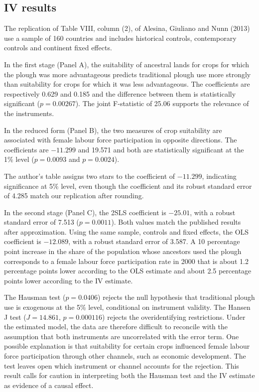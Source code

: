 \documentclass[12pt,a4paper]{article}
\begin{document}
\subsection{IV results}\label{sec:iv}

The replication of Table VIII, column (2), of Alesina, Giuliano and Nunn (2013) use a sample of 160 countries and includes historical controls, contemporary controls and continent fixed effects.

In the first stage (Panel A), the suitability of ancestral lands for crops for which the plough was more advantageous predicts traditional plough use more strongly than suitability for crops for which it was less advantageous. The coefficients are respectively 0.629 and 0.185 and the difference between them is statistically significant ($p=0.00267$). The joint F-statistic of 25.06 supports the relevance of the instruments.

In the reduced form (Panel B), the two measures of crop suitability are associated with female labour force participation in opposite directions. The coefficients are $-11.299$ and 19.571 and both are statistically significant at the 1\% level ($p=0.0093$ and $p=0.0024$).

The author's table assigns two stars to the coefficient of $-11.299$, indicating significance at 5\% level, even though the coefficient and its robust standard error of 4.285 match our replication after rounding.

In the second stage (Panel C), the 2SLS coefficient is $-25.01$, with a robust standard error of 7.513 ($p=0.0011$). Both values match the published results after approximation. Using the same sample, controls and fixed effects, the OLS coefficient is $-12.089$, with a robust standard error of 3.587. A 10 percentage point increase in the share of the population whose ancestors used the plough corresponds to a female labour force participation rate in 2000 that is about 1.2 percentage points lower according to the OLS estimate and about 2.5 percentage points lower according to the IV estimate.

The Hausman test ($p=0.0406$) rejects the null hypothesis that traditional plough use is exogenous at the 5\% level, conditional on instrument validity. The Hansen J test ($J=14.861$, $p=0.000116$) rejects the overidentifying restrictions. Under the estimated model, the data are therefore difficult to reconcile with the assumption that both instruments are uncorrelated with the error term. One possible explanation is that suitability for certain crops influenced female labour force participation through other channels, such as economic development. The test leaves open which instrument or channel accounts for the rejection. This result calls for caution in interpreting both the Hausman test and the IV estimate as evidence of a causal effect.
\end{document}
